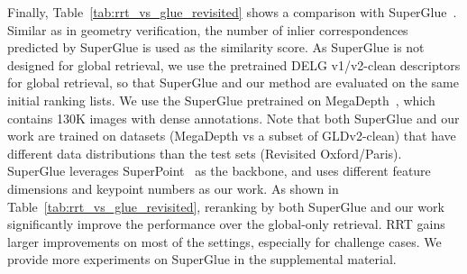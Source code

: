 Finally, Table~\ref{tab:rrt_vs_glue_revisited} shows a comparison with SuperGlue~\cite{superglue2020}.  
Similar as in geometry verification, the number of inlier correspondences predicted by SuperGlue is used as the similarity score. 
As SuperGlue is not designed for global retrieval, we use the pretrained DELG v1/v2-clean descriptors for global retrieval, so that SuperGlue and our method are evaluated on the same initial ranking lists. 
We use the SuperGlue pretrained on MegaDepth~\cite{megadepth2018}, which contains 130K images with dense annotations. 
Note that both SuperGlue and our work are trained on datasets (MegaDepth vs a subset of GLDv2-clean) that have different data distributions than the test sets (Revisited Oxford/Paris). 
SuperGlue leverages SuperPoint~\cite{superpoint2018} as the backbone, and uses different feature dimensions and keypoint numbers as our work. 
As shown in Table~\ref{tab:rrt_vs_glue_revisited},
reranking by both SuperGlue and our work significantly improve the performance over the global-only retrieval. RRT gains larger improvements on most of the settings, especially for challenge cases. We provide more experiments on SuperGlue in the supplemental material.

